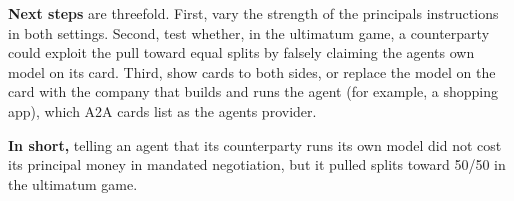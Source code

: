 \documentclass[letterpaper]{article}
\begin{document}
\textbf{Next steps} are threefold. First, vary the strength of the principal\textquotesingle s instructions in both settings. Second, test whether, in the ultimatum game, a counterparty could exploit the pull toward equal splits by falsely claiming the agent\textquotesingle s own model on its card. Third, show cards to both sides, or replace the model on the card with the company that builds and runs the agent (for example, a shopping app), which A2A cards list as the agent\textquotesingle s provider.

\textbf{In short,} telling an agent that its counterparty runs its own model did not cost its principal money in mandated negotiation, but it pulled splits toward 50/50 in the ultimatum game.
\nocite{*}


\end{document}
